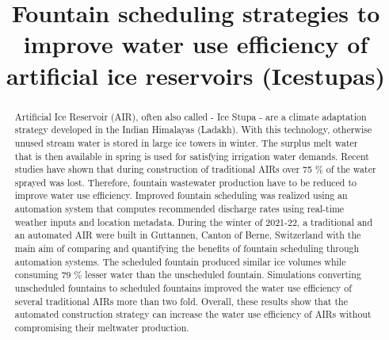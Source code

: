 \documentclass[tc, manuscript]{copernicus}
\begin{document}
\title{Fountain scheduling strategies to improve water use efficiency of artificial
ice reservoirs (Icestupas)}

\def\Authors{Suryanarayanan Balasubramanian\,$^{1,2}$, Martin Hoelzle\,$^{1}$Roger Waser\,$^{3}$, $Martin Von
Burg^{3}\,$}

\def\Address{$^{1}$University of Fribourg, Department of Geosciences, Fribourg, Switzerland $^{2}$University of
Applied Sciences and Arts, Luzern, Switzerland} \def\corrAuthor{Suryanarayanan Balasubramanian}





\maketitle

\begin{abstract}

  Artificial Ice Reservoir (AIR), often also called - Ice Stupa - are a climate adaptation strategy developed in
  the Indian Himalayas (Ladakh). With this technology, otherwise unused stream water is stored in large ice
  towers in winter. The surplus melt water that is then available in spring is used for satisfying irrigation
  water demands. Recent studies have shown that during construction of traditional AIRs over 75 \% of the water
  sprayed was lost. Therefore, fountain wastewater production have to be reduced to improve water use
  efficiency. Improved fountain scheduling was realized using an automation system that computes recommended
  discharge rates using real-time weather inputs and location metadata. During the winter of 2021-22, a
  traditional and an automated AIR were built in Guttannen, Canton of Berne, Switzerland with the main aim of
  comparing and quantifying the benefits of fountain scheduling through automation systems. The scheduled
  fountain produced similar ice volumes while consuming 79 \% lesser water than the unscheduled fountain.
  Simulations converting unscheduled fountains to scheduled fountains improved the water use efficiency of
  several traditional AIRs more than two fold. Overall, these results show that the automated construction
  strategy can increase the water use efficiency of AIRs without compromising their meltwater production.

\end{abstract}
\end{document}
